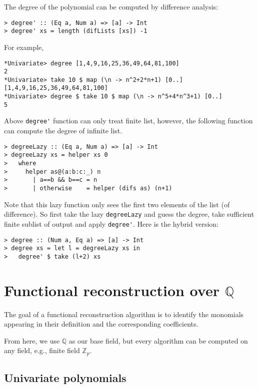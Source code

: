 \documentclass[11pt]{book}
\begin{document}
The degree of the polynomial can be computed by difference analysis:
\begin{verbatim}
> degree' :: (Eq a, Num a) => [a] -> Int
> degree' xs = length (difLists [xs]) -1
\end{verbatim}
For example,
\begin{verbatim}
*Univariate> degree [1,4,9,16,25,36,49,64,81,100]
2
*Univariate> take 10 $ map (\n -> n^2+2*n+1) [0..]
[1,4,9,16,25,36,49,64,81,100]
*Univariate> degree $ take 10 $ map (\n -> n^5+4*n^3+1) [0..]
5
\end{verbatim}

Above \verb+degree'+ function can only treat finite list, however, the following function can compute the degree of infinite list.
\begin{verbatim} 
> degreeLazy :: (Eq a, Num a) => [a] -> Int
> degreeLazy xs = helper xs 0
>   where
>     helper as@(a:b:c:_) n
>       | a==b && b==c = n
>       | otherwise    = helper (difs as) (n+1)
\end{verbatim}
Note that this lazy function only sees the first two elements of the list (of difference).
So first take the lazy \verb+degreeLazy+ and guess the degree, take sufficient finite sublist of output and apply \verb+degree'+.
Here is the hybrid version:
\begin{verbatim}
> degree :: (Num a, Eq a) => [a] -> Int
> degree xs = let l = degreeLazy xs in
>   degree' $ take (l+2) xs
\end{verbatim}

\chapter{Functional reconstruction over $\mathbb{Q}$}
The goal of a functional reconstruction algorithm is to identify the monomials appearing in their definition and the corresponding coefficients.

From here, we use $\mathbb{Q}$ as our base field, but every algorithm can be computed on any field, e.g., finite field $\mathbb{Z}_p$.

\section{Univariate polynomials}
\end{document}
